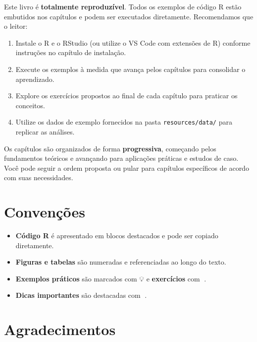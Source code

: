 \documentclass[
  letterpaper,
]{book}
\providecommand{\tightlist}{%
  \setlength{\itemsep}{0pt}\setlength{\parskip}{0pt}}\usepackage{longtable,booktabs,array}
\begin{document}

Este livro é \textbf{totalmente reproduzível}. Todos os exemplos de
código R estão embutidos nos capítulos e podem ser executados
diretamente. Recomendamos que o leitor:

\begin{enumerate}
\def\labelenumi{\arabic{enumi}.}
\tightlist
\item
  Instale o R e o RStudio (ou utilize o VS Code com extensões de R)
  conforme instruções no capítulo de instalação.
\item
  Execute os exemplos à medida que avança pelos capítulos para
  consolidar o aprendizado.
\item
  Explore os exercícios propostos ao final de cada capítulo para
  praticar os conceitos.
\item
  Utilize os dados de exemplo fornecidos na pasta
  \texttt{resources/data/} para replicar as análises.
\end{enumerate}

Os capítulos são organizados de forma \textbf{progressiva}, começando
pelos fundamentos teóricos e avançando para aplicações práticas e
estudos de caso. Você pode seguir a ordem proposta ou pular para
capítulos específicos de acordo com suas necessidades.

\section*{Convenções}\label{convenuxe7uxf5es}


\begin{itemize}
\tightlist
\item
  \textbf{Código R} é apresentado em blocos destacados e pode ser
  copiado diretamente.
\item
  \textbf{Figuras e tabelas} são numeradas e referenciadas ao longo do
  texto.
\item
  \textbf{Exemplos práticos} são marcados com 💡 e \textbf{exercícios}
  com 📝.
\item
  \textbf{Dicas importantes} são destacadas com 🔔.
\end{itemize}

\section*{Agradecimentos}\label{agradecimentos}
\end{document}
